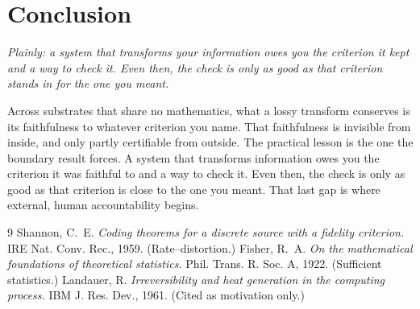 \documentclass[11pt]{article}
\begin{document}
\section{Conclusion}
\emph{Plainly: a system that transforms your information owes you the criterion it kept and a way to check it. Even then, the check is only as good as that criterion stands in for the one you meant.}

Across substrates that share no mathematics, what a lossy transform conserves is its faithfulness to whatever criterion you name. That faithfulness is invisible from inside, and only partly certifiable from outside. The practical lesson is the one the boundary result forces. A system that transforms information owes you the criterion it was faithful to and a way to check it. Even then, the check is only as good as that criterion is close to the one you meant. That last gap is where external, human accountability begins.

\begin{thebibliography}{9}
\small
{} Shannon, C.~E. \emph{Coding theorems for a discrete source with a fidelity criterion.} IRE Nat. Conv. Rec., 1959. (Rate--distortion.)
 Fisher, R.~A. \emph{On the mathematical foundations of theoretical statistics.} Phil. Trans. R. Soc. A, 1922. (Sufficient statistics.)
 Landauer, R. \emph{Irreversibility and heat generation in the computing process.} IBM J. Res. Dev., 1961. (Cited as motivation only.)
\end{thebibliography}
\end{document}
